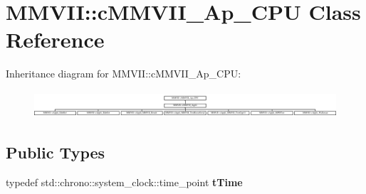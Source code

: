 \hypertarget{classMMVII_1_1cMMVII__Ap__CPU}{}\section{M\+M\+V\+II\+:\+:c\+M\+M\+V\+I\+I\+\_\+\+Ap\+\_\+\+C\+PU Class Reference}
\label{classMMVII_1_1cMMVII__Ap__CPU}
Inheritance diagram for M\+M\+V\+II\+:\+:c\+M\+M\+V\+I\+I\+\_\+\+Ap\+\_\+\+C\+PU\+:\begin{figure}[H]
\begin{center}
\leavevmode
\includegraphics[height=1.012658cm]{classMMVII_1_1cMMVII__Ap__CPU}
\end{center}
\end{figure}
\subsection*{Public Types}
\begin{DoxyCompactItemize}
\item 
typedef std\+::chrono\+::system\+\_\+clock\+::time\+\_\+point {\bfseries t\+Time}\hypertarget{classMMVII_1_1cMMVII__Ap__CPU_aeb75d167610d7bd5980deb2915df3256}{}\label{classMMVII_1_1cMMVII__Ap__CPU_aeb75d167610d7bd5980deb2915df3256}

\end{DoxyCompactItemize}
